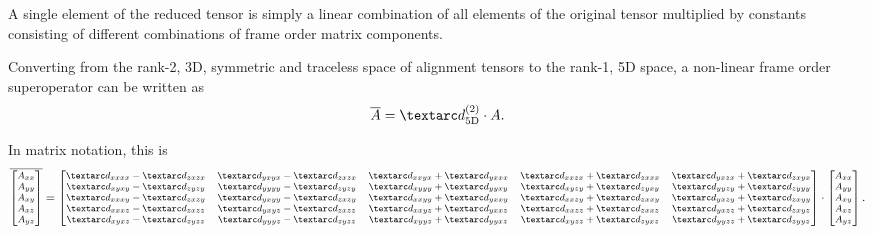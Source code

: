 A single element of the reduced tensor is simply a linear combination of all elements of the original tensor multiplied by constants consisting of different combinations of frame order matrix components.

Converting from the rank-2, 3D, symmetric and traceless space of alignment tensors to the rank-1, 5D space, a non-linear frame order superoperator can be written as
\begin{equation} \label{eq: frame order superoperator}
    \overline A = \FOtwo_\textrm{5D} \cdot A .
\end{equation}

In matrix notation, this is
\begin{equation} \label{eq: frame order superoperator matrix}
\begin{footnotesize}
    \overline{
        \begin{bmatrix}
            A_{xx} \\
            A_{yy} \\
            A_{xy} \\
            A_{xz} \\
            A_{yz}
        \end{bmatrix}
    } =
        \begin{bmatrix}
            \FO_{xxxx} - \FO_{zxzx}  &  \FO_{yxyx} - \FO_{zxzx} &  \FO_{xxyx} + \FO_{yxxx} &  \FO_{xxzx} + \FO_{zxxx} &  \FO_{yxzx} + \FO_{zxyx} \\
            \FO_{xyxy} - \FO_{zyzy}  &  \FO_{yyyy} - \FO_{zyzy} &  \FO_{xyyy} + \FO_{yyxy} &  \FO_{xyzy} + \FO_{zyxy} &  \FO_{yyzy} + \FO_{zyyy} \\
            \FO_{xxxy} - \FO_{zxzy}  &  \FO_{yxyy} - \FO_{zxzy} &  \FO_{xxyy} + \FO_{yxxy} &  \FO_{xxzy} + \FO_{zxxy} &  \FO_{yxzy} + \FO_{zxyy} \\
            \FO_{xxxz} - \FO_{zxzz}  &  \FO_{yxyz} - \FO_{zxzz} &  \FO_{xxyz} + \FO_{yxxz} &  \FO_{xxzz} + \FO_{zxxz} &  \FO_{yxzz} + \FO_{zxyz} \\
            \FO_{xyxz} - \FO_{zyzz}  &  \FO_{yyyz} - \FO_{zyzz} &  \FO_{xyyz} + \FO_{yyxz} &  \FO_{xyzz} + \FO_{zyxz} &  \FO_{yyzz} + \FO_{zyyz}
        \end{bmatrix}
        \cdot
        \begin{bmatrix}
            A_{xx} \\
            A_{yy} \\
            A_{xy} \\
            A_{xz} \\
            A_{yz}
        \end{bmatrix}
    .
\end{footnotesize}
\end{equation}

